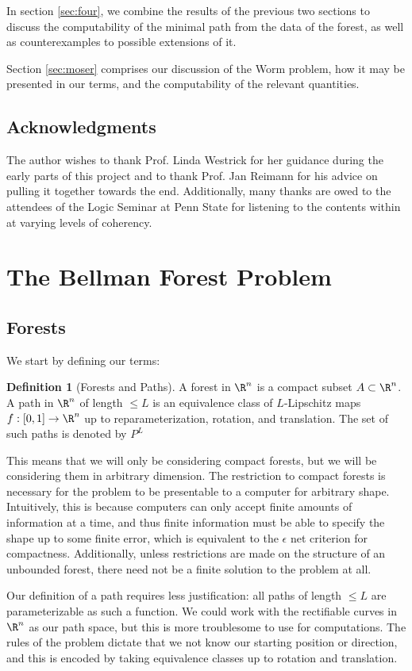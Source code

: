 \documentclass{journal}
\theoremstyle{definition}
\newtheorem{dfn}[thm]{Definition}
\begin{document}
In section \ref{sec:four}, we combine the results of the previous two sections to discuss the computability of the minimal path from the data of the forest, as well as counterexamples to possible extensions of it.

Section \ref{sec:moser} comprises our discussion of the Worm problem, how it may be presented in our terms, and the computability of the relevant quantities.

\subsection{Acknowledgments}
The author wishes to thank Prof. Linda Westrick for her guidance during the early parts of this project and to thank Prof. Jan Reimann for his advice on pulling it together towards the end. Additionally, many thanks are owed to the attendees of the Logic Seminar at Penn State for listening to the contents within at varying levels of coherency.

\section{The Bellman Forest Problem}
\label{sec:two}
\subsection{Forests}
\label{sec:forests}
We start by defining our terms:
\begin{dfn}[Forests and Paths]
A forest in $\R^n$ is a compact subset $A\subset\R^n$. A path in $\R^n$ of length $\leq L$ is an equivalence class of $L$-Lipschitz maps $f:[0,1]\rightarrow \R^n$ up to reparameterization, rotation, and translation. The set of such paths is denoted by $P^L$
\end{dfn}
\label{dfn:forpath}
This means that we will only be considering compact forests, but we will be considering them in arbitrary dimension. The restriction to compact forests is necessary for the problem to be presentable to a computer for arbitrary shape. Intuitively, this is because computers can only accept finite amounts of information at a time, and thus finite information must be able to specify the shape up to some finite error, which is equivalent to the $\epsilon$ net criterion for compactness. Additionally, unless restrictions are made on the structure of an unbounded forest, there need not be a finite solution to the problem at all. 

Our definition of a path requires less justification: all paths of length $\leq L$ are parameterizable as such a function. We could work with the rectifiable curves in $\R^n$ as our path space, but this is more troublesome to use for computations. The rules of the problem dictate that we not know our starting position or direction, and this is encoded by taking equivalence classes up to rotation and translation.
\end{document}
